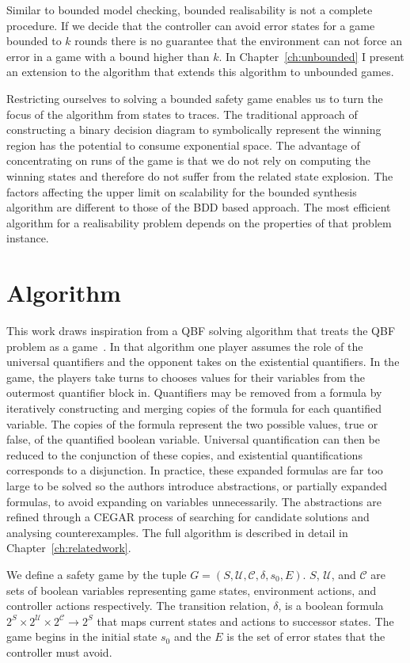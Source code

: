 Similar to bounded model checking, bounded realisability is not a complete procedure.  If we decide that the controller can avoid error states for a game bounded to $k$ rounds there is no guarantee that the environment can not force an error in a game with a bound higher than $k$. In Chapter~\ref{ch:unbounded} I present an extension to the algorithm that extends this algorithm to unbounded games.

Restricting ourselves to solving a bounded safety game enables us to turn the focus of the algorithm from states to traces. The traditional approach of constructing a binary decision diagram to symbolically represent the winning region has the potential to consume exponential space. The advantage of concentrating on runs of the game is that we do not rely on computing the winning states and therefore do not suffer from the related state explosion. The factors affecting the upper limit on scalability for the bounded synthesis algorithm are different to those of the BDD based approach. The most efficient algorithm for a realisability problem depends on the properties of that problem instance.

\section{Algorithm}

This work draws inspiration from a QBF solving algorithm that treats the QBF problem as a game~\cite{Janota12}. In that algorithm one player assumes the role of the universal quantifiers and the opponent takes on the existential quantifiers. In the game, the players take turns to chooses values for their variables from the outermost quantifier block in. Quantifiers may be removed from a formula by iteratively constructing and merging copies of the formula for each quantified variable. The copies of the formula represent the two possible values, true or false, of the quantified boolean variable. Universal quantification can then be reduced to the conjunction of these copies, and existential quantifications corresponds to a disjunction. In practice, these expanded formulas are far too large to be solved so the authors introduce abstractions, or partially expanded formulas, to avoid expanding on variables unnecessarily. The abstractions are refined through a CEGAR process of searching for candidate solutions and analysing counterexamples. The full algorithm is described in detail in Chapter~\ref{ch:relatedwork}. 

We define a safety game by the tuple $G = (S, \mathcal{U}, \mathcal{C}, \delta, s_0, E)$. $S$, $\mathcal{U}$, and $\mathcal{C}$ are sets of boolean variables representing game states, environment actions, and controller actions respectively. The transition relation, $\delta$, is a boolean formula $2^{S} \times 2^{\mathcal{U}} \times 2^{\mathcal{C}} \to 2^{S}$ that maps current states and actions to successor states. The game begins in the initial state $s_0$ and the $E$ is the set of error states that the controller must avoid.

